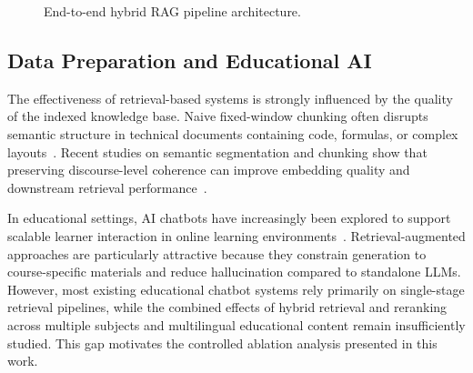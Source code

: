 \documentclass[runningheads]{llncs}
\begin{document}
\begin{figure}[!t]
{%
}
\caption{End-to-end hybrid RAG pipeline architecture.}
\label{fig:rag_pipeline}
\end{figure}

\subsection{Data Preparation and Educational AI}

The effectiveness of retrieval-based systems is strongly influenced by the quality of the indexed knowledge base. Naive fixed-window chunking often disrupts semantic structure in technical documents containing code, formulas, or complex layouts~\cite{gao2023survey}. Recent studies on semantic segmentation and chunking show that preserving discourse-level coherence can improve embedding quality and downstream retrieval performance~\cite{duarte2024lumberchunker,qu2025semantic}. 

In educational settings, AI chatbots have increasingly been explored to support scalable learner interaction in online learning environments~\cite{winkler2020chatbots}. Retrieval-augmented approaches are particularly attractive because they constrain generation to course-specific materials and reduce hallucination compared to standalone LLMs. However, most existing educational chatbot systems rely primarily on single-stage retrieval pipelines, while the combined effects of hybrid retrieval and reranking across multiple subjects and multilingual educational content remain insufficiently studied. This gap motivates the controlled ablation analysis presented in this work.
\end{document}
